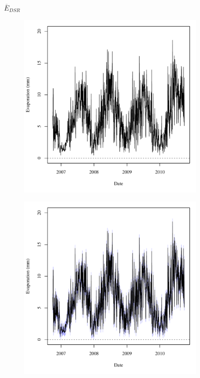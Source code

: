 \begin{landscape}
	\begin{figure}
		\centering
		$ \displaystyle \overline{E}_{DSR} $
		\begin{subfigure}{0.7\textwidth}
			\centering
			\includegraphics[width=\tableCustomSize]{"Figures/Results_DSR/Deterministic/A Evap"}
		\end{subfigure}%
		\begin{subfigure}{0.7\textwidth}
			\centering
			\includegraphics[width=\tableCustomSize]{"Figures/Results_DSR/Stochastic/A Evap"}

\end{subfigure}
\end{figure}
\end{landscape}
